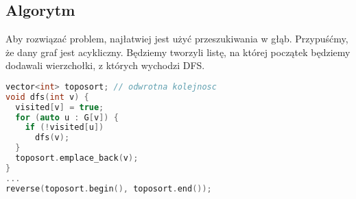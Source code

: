 \documentclass[../main.tex]{subfiles}
\begin{document}
\subsection{Algorytm}

\begin{frame}[fragile]{\subsecname}

Aby rozwiązać problem, najłatwiej jest użyć przeszukiwania w głąb.
Przypuśćmy, że dany graf jest acykliczny. Będziemy tworzyli listę, na której początek będziemy
dodawali wierzchołki, z których wychodzi DFS.

\pause
\begin{block}{}
\begin{lstlisting}[language = C++]
vector<int> toposort; // odwrotna kolejnosc
void dfs(int v) {
  visited[v] = true;
  for (auto u : G[v]) {
    if (!visited[u])
      dfs(v);
  }
  toposort.emplace_back(v);
}
...
reverse(toposort.begin(), toposort.end());
\end{lstlisting}
\end{block}

\end{frame}
\end{document}
